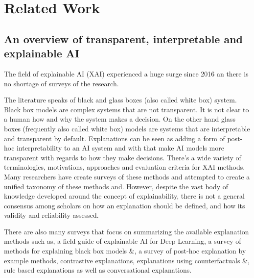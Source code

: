 \documentclass[manuscript,screen,review]{acmart}
\begin{document}
\section{Related Work}\label{sec:related-work}
%
%

\subsection{An overview of transparent, interpretable and explainable AI}\label{subsec:an-overview-of-transparent-interpretable-and-explainable-ai}
The field of explainable AI (XAI) experienced a huge surge since 2016 an there is no shortage of surveys of the research.

The literature speaks of black and glass boxes (also called white box) system.
Black box models are complex systems that are not transparent.
It is not clear to a human how and why the system makes a decision.
On the other hand glass boxes (frequently also called white box) models are systems that are interpretable and transparent by default.
Explanations can be seen as adding a form of post-hoc interpretability to an AI system and with that make AI models more transparent with regards to how they make decisions.
There's a wide variety of terminologies, motivations, approaches and evaluation criteria for XAI methods.
Many researchers have create surveys of these methods and attempted to create a unified taxonomy of these methods\cite{Linardatos2021} and\cite{Schwalbe2021}.
However, despite the vast body of knowledge developed around the concept of explainability, there is not a general consensus among scholars on how an explanation should be defined, and how its validity and reliability assessed\cite{Vilone2021}.

There are also many surveys that focus on summarizing the available explanation methods such as\cite{Vilone2020},
a field guide of explainable AI for Deep Learning\cite{Ras2020}, a survey of methods for explaining black box models\cite{Guidotti2018a} \&\cite{Adadi2018},
a survey of post-hoc explanation by example methods\cite{Keane2019}, contrastive explanations\cite{Miller2021},
explanations using counterfactuals\cite{Verma2020} \&\cite{Keane2020}, rule based explanations\cite{Guidotti2018} as well
as conversational explanations\cite{Sokol2018}.
\end{document}
